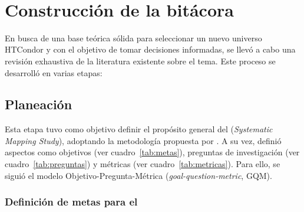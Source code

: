 \label{cap:revisionLiteratura}
\mbox{}\\
\section{Construcción de la bitácora}

En busca de una base teórica sólida para seleccionar un nuevo universo HTCondor y con el objetivo de tomar decisiones informadas, se llevó a cabo una revisión exhaustiva de la literatura existente sobre el tema. Este proceso se desarrolló en varias etapas:


\subsection{Planeación}

Esta etapa tuvo como objetivo definir el propósito general del \SMS (\textit{Systematic Mapping Study}), adoptando la metodología propuesta por \cite{Sepulveda2021}.
A su vez, definió aspectos como objetivos (ver cuadro~\ref{tab:metas}), preguntas de investigación (ver cuadro~\ref{tab:preguntas}) y métricas (ver cuadro~\ref{tab:metricas}). Para ello, se siguió el modelo
Objetivo-Pregunta-Métrica (\textit{goal-question-metric}, GQM).

\subsubsection{Definición de metas para el \SMS}

